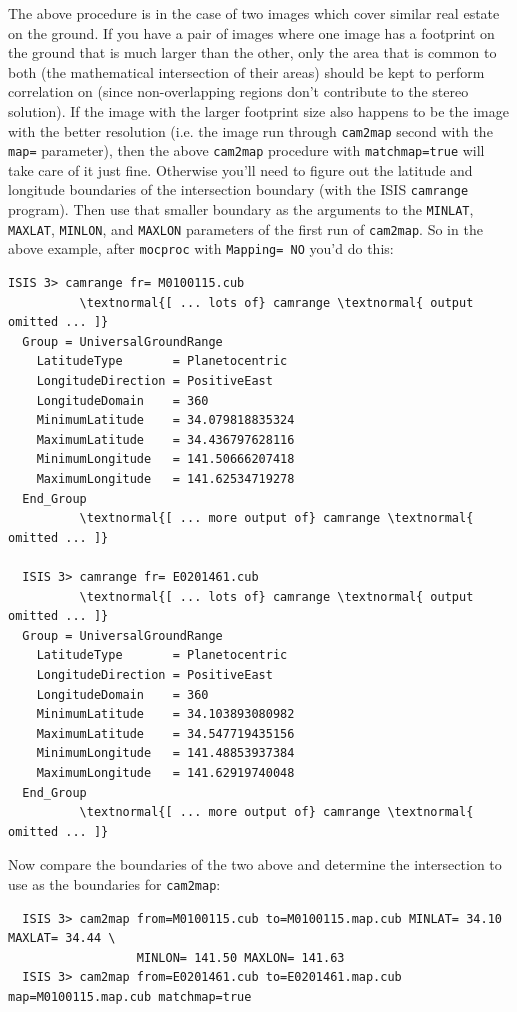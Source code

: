 The above procedure is in the case of two images which cover similar
real estate on the ground.  If you have a pair of images where one
image has a footprint on the ground that is much larger than the
other, only the area that is common to both (the mathematical
intersection of their areas) should be kept to perform correlation
on (since non-overlapping regions don't contribute to the stereo
solution).  If the image with the larger footprint size also happens
to be the image with the better resolution (i.e. the image run through
\texttt{cam2map} second with the \texttt{map=} parameter), then the
above \texttt{cam2map} procedure with \texttt{matchmap=true} will take care
of it just fine.  Otherwise you'll need to figure out the latitude
and longitude boundaries of the intersection boundary 
(with the \ac{ISIS} \texttt{camrange} program).  Then use that smaller
boundary as the arguments to the \texttt{MINLAT}, \texttt{MAXLAT},
\texttt{MINLON}, and \texttt{MAXLON} parameters of the first run
of \texttt{cam2map}.  So in the above example, after \texttt{mocproc} with
\texttt{Mapping= NO} you'd do this:

\begin{Verbatim}[commandchars=\\\{\}]
  ISIS 3> camrange fr= M0100115.cub
          \textnormal{[ ... lots of} camrange \textnormal{ output omitted ... ]}
  Group = UniversalGroundRange
    LatitudeType       = Planetocentric
    LongitudeDirection = PositiveEast
    LongitudeDomain    = 360
    MinimumLatitude    = 34.079818835324
    MaximumLatitude    = 34.436797628116
    MinimumLongitude   = 141.50666207418
    MaximumLongitude   = 141.62534719278
  End_Group
          \textnormal{[ ... more output of} camrange \textnormal{ omitted ... ]}

  ISIS 3> camrange fr= E0201461.cub
          \textnormal{[ ... lots of} camrange \textnormal{ output omitted ... ]}
  Group = UniversalGroundRange
    LatitudeType       = Planetocentric
    LongitudeDirection = PositiveEast
    LongitudeDomain    = 360
    MinimumLatitude    = 34.103893080982
    MaximumLatitude    = 34.547719435156
    MinimumLongitude   = 141.48853937384
    MaximumLongitude   = 141.62919740048
  End_Group
          \textnormal{[ ... more output of} camrange \textnormal{ omitted ... ]}
\end{Verbatim}

Now compare the boundaries of the two above and determine the intersection to use as the boundaries for \texttt{cam2map}:

\begin{Verbatim}
  ISIS 3> cam2map from=M0100115.cub to=M0100115.map.cub MINLAT= 34.10 MAXLAT= 34.44 \
                  MINLON= 141.50 MAXLON= 141.63
  ISIS 3> cam2map from=E0201461.cub to=E0201461.map.cub map=M0100115.map.cub matchmap=true
\end{Verbatim}

